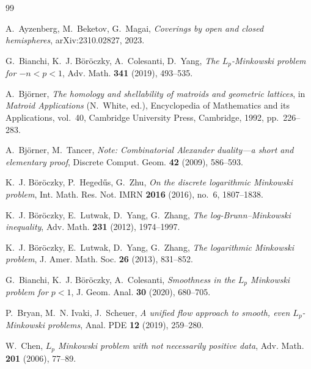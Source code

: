 \documentclass[12pt,reqno]{amsart}
\numberwithin{equation}{section}
\theoremstyle{remark}
\begin{document}
\begin{thebibliography}{99}
	
	A.~Ayzenberg, M.~Beketov,  G.~Magai,
	\emph{Coverings by open and closed hemispheres},
	arXiv:2310.02827, 2023.
	
	G.~Bianchi, K.~J. B\"or\"oczky, A.~Colesanti,  D.~Yang,
	\emph{The $L_p$-Minkowski problem for $-n<p<1$},
	Adv. Math. \textbf{341} (2019), 493--535.
	
	A.~Bj\"orner,
	\emph{The homology and shellability of matroids and geometric lattices},
	in \emph{Matroid Applications} (N.~White, ed.), Encyclopedia of Mathematics and its Applications, vol.~40,
	Cambridge University Press, Cambridge, 1992, pp.~226--283.
	
	A.~Bj\"orner,  M.~Tancer,
	\emph{Note: Combinatorial Alexander duality---a short and elementary proof},
	Discrete Comput. Geom. \textbf{42} (2009), 586--593.
	
	K.~J. B\"or\"oczky, P.~Heged\H{u}s,  G.~Zhu,
	\emph{On the discrete logarithmic Minkowski problem},
	Int. Math. Res. Not. IMRN \textbf{2016} (2016), no.~6, 1807--1838.
	
	K.~J. B\"or\"oczky, E.~Lutwak, D.~Yang,  G.~Zhang,
	\emph{The log-Brunn--Minkowski inequality},
	Adv. Math. \textbf{231} (2012), 1974--1997.
	
	K.~J. B\"or\"oczky, E.~Lutwak, D.~Yang,  G.~Zhang,
	\emph{The logarithmic Minkowski problem},
	J. Amer. Math. Soc. \textbf{26} (2013), 831--852.
	
	G.~Bianchi, K.~J. B\"or\"oczky,  A.~Colesanti,
	\emph{Smoothness in the $L_p$ Minkowski problem for $p<1$},
	J. Geom. Anal. \textbf{30} (2020), 680--705.
	
	
	P.~Bryan, M.~N. Ivaki,  J.~Scheuer,
	\emph{A unified flow approach to smooth, even
		$L_p$-Minkowski problems},
	Anal. PDE \textbf{12} (2019), 259--280.
	
	
	W.~Chen,
	\emph{$L_p$ Minkowski problem with not necessarily positive data},
	Adv. Math. \textbf{201} (2006), 77--89.
	

\end{thebibliography}
\end{document}

